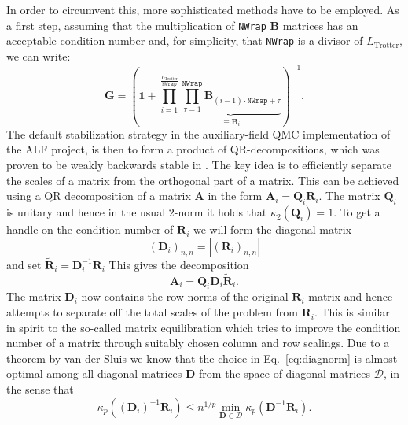 In order to circumvent this, more sophisticated methods have to be employed. As a first step, assuming that the multiplication of \texttt{NWrap} $\bm{B}$ matrices has an acceptable condition number and, for simplicity, that \texttt{NWrap} is a divisor of $L_{\text{Trotter}}$, we can write:
\begin{equation}
\bm{G} = \left( \mathds{1} + \prod\limits_{ i = 1}^{\frac{L_{\text{Trotter}}} {\texttt{NWrap}}}       \underbrace{\prod_{\tau=1}^{\texttt{NWrap}} \bm{B}_{(i-1)  \cdot  \texttt{NWrap}+ \tau} }_{ \equiv \mathcal{\bm{B}}_i}\right)^{-1}.
\end{equation}
The default stabilization strategy in the auxiliary-field QMC implementation of the ALF project, is then to form a product of QR-decompositions, which was proven to be weakly backwards stable in \cite{Bai2011}.
The key idea is to efficiently separate the scales of a matrix from the orthogonal part of a matrix.
This can be achieved using a QR decomposition of a matrix $\bm{A}$ in the form $\bm{A}_i = \bm{Q}_i \bm{R}_i$. The matrix $\bm{Q}_i$ is unitary and hence in the usual $2$-norm it holds that $\kappa_2(\bm{Q}_i) = 1$.
To get a handle on the condition number of $\bm{R}_i$ we will form the
diagonal matrix
\begin{equation}
(\bm{D}_i)_{n,n} = |(\bm{R}_i)_{n,n}|
\label{eq:diagnorm}
\end{equation}
and set $\tilde{\bm{R}}_i = \bm{D}_i^{-1} \bm{R}_i$
This gives the decomposition
\begin{equation}
\bm{A}_i = \bm{Q}_i \bm{D}_i \tilde{\bm{R}}_i.
\end{equation}
The matrix $\bm{D}_i$ now contains the row norms of the original $\bm{R}_i$ matrix and hence attempts to separate off the total scales of the problem from $\bm{R}_i$.
This is similar in spirit to the so-called matrix equilibration which tries to improve the condition number of a matrix through suitably chosen column and row scalings.
Due to a theorem by van der Sluis \cite{vanderSluis1969} we know that the choice in Eq.~\eqref{eq:diagnorm} is almost optimal among all diagonal matrices $\bm{D}$ from the space of diagonal matrices $\mathcal{D}$, in the sense that
\begin{equation*}
\kappa_p((\bm{D}_i)^{-1} \bm{R}_i ) \leq n^{1/p} \min_{\bm{D} \in \mathcal{D}} \kappa_p(\bm{D}^{-1} \bm{R}_i).
\end{equation*}
